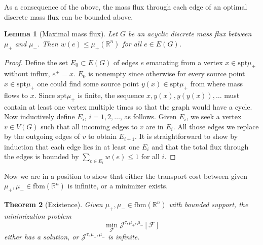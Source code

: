 \documentclass[10pt,a4paper,oneside,final]{article}
\newcommand{\R}{{\mathbb{R}}}
\newcommand{\fbm}{{\mathrm{fbm}}}
\newcommand{\spt}{{\mathrm{spt}}}
\newcommand{\flux}{{\mathcal{F}}}
\newcommand{\JEn}{{\mathcal{J}}}
\newcommand{\transportPath}{mass flux}
\numberwithin{equation}{section}
\theoremstyle{plain}
\newtheorem{theorem}{Theorem}[section]
\newtheorem{lemma}[theorem]{Lemma}
\theoremstyle{definition}
\theoremstyle{remark}
\begin{document}
As a consequence of the above, the mass flux through each edge of an optimal discrete \transportPath{} can be bounded above.

\begin{lemma}[Maximal mass flux]\label{thm:bounded_maximal_flux}
Let $G$ be an acyclic discrete \transportPath{} between $\mu_+$ and $\mu_-$. Then $w(e)\leq\mu_+(\R^n)$ for all $e\in E(G)$.
\end{lemma}

\begin{proof}
Define the set $E_0\subset E(G)$ of edges $e$ emanating from a vertex $x\in\spt\mu_+$ without influx, $e^+=x$.
$E_0$ is nonempty since otherwise for every source point $x\in\spt\mu_+$ one could find some source point $y(x)\in\spt\mu_+$ from where mass flows to $x$.
Since $\spt\mu_+$ is finite, the sequence $x,y(x),y(y(x)),\ldots$ must contain at least one vertex multiple times so that the graph would have a cycle.
Now inductively define $E_i$, $i=1,2,\ldots$, as follows.
Given $E_i$, we seek a vertex $v\in V(G)$ such that all incoming edges to $v$ are in $E_i$.
All those edges we replace by the outgoing edges of $v$ to obtain $E_{i+1}$.
It is straightforward to show by induction that each edge lies in at least one $E_i$
and that the total flux through the edges is bounded by $\sum_{e\in E_i}w(e)\leq1$ for all $i$.
\end{proof}

Now we are in a position to show that either the transport cost between given $\mu_+,\mu_-\in\fbm(\R^n)$ is infinite, or a minimizer exists.

\begin{theorem}[Existence]\label{thm:existence_of_minimizers_fluxes}
Given $\mu_+,\mu_-\in\fbm(\R^n)$ with bounded support, the minimization problem
\begin{displaymath}
 \min_\flux \JEn^{\tau,\mu_+,\mu_-}[\flux]
\end{displaymath}
either has a solution, or $\JEn^{\tau,\mu_+,\mu_-}$ is infinite.
\end{theorem}
\end{document}
